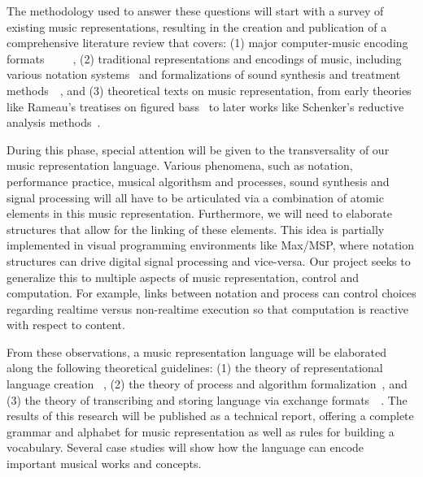 \documentclass{article}
\begin{document}
The methodology used to answer these questions will start with a survey of
existing music representations, resulting in the creation and publication of
a comprehensive literature review that covers: (1) major computer-music
encoding
formats~\cite{hoos98}~\cite{lilypond06}~\cite{good2001musicxml}~\cite{alvaro2010musicjson}~\cite{roland2002music},
(2) traditional representations and encodings of music,
including various notation systems~\cite{hultberg2000printed} and formalizations
of sound synthesis and treatment
methods~\cite{mason1953feedback}~\cite{foote1999visualizing},
and (3) theoretical texts on music representation, from
early theories like Rameau's treatises on figured bass~\cite{rameau:1722} to later works
like Schenker’s reductive analysis methods~\cite{schenker:1935}.

During this phase, special attention will be given to the transversality of
our music representation language.  Various phenomena, such as notation,
performance practice, musical algorithsm and processes, sound synthesis and
signal processing will all have to be articulated via a combination of
atomic elements in this music representation.  Furthermore, we will need to
elaborate structures that allow for the linking of these elements.
This idea is partially implemented in visual programming environments like Max/MSP, where notation
structures can drive digital signal processing and vice-versa. Our project
seeks to generalize this to multiple aspects of music representation, control and
computation. For example, links between notation and process can control choices regarding
real\-time versus non-real\-time execution so that computation is reactive with
respect to content.

From these observations, a music representation language will be elaborated
along the following theoretical guidelines: (1) the theory of
representational language creation \cite{wagner2002design}~\cite{shieber1984design},
(2) the theory of process and algorithm
formalization~\cite{salwicki1970formalized}, and
(3) the theory of transcribing and storing language via exchange
formats~\cite{qiu1999programming}~\cite{gruber1993translation}. The
results of this research will be published as a technical report, offering a
complete grammar and alphabet for music representation as well as rules for
building a vocabulary. Several case studies will show how the language can
encode important musical works and concepts.
\end{document}
